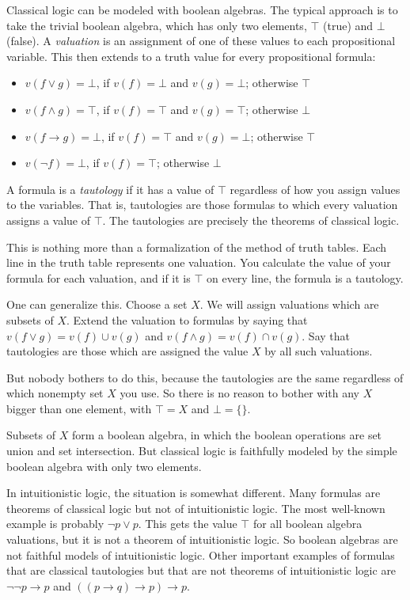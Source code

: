 \documentclass{article}
\def\imp{\rightarrow}           %
\begin{document}
Classical logic can be modeled with boolean algebras.  The typical
approach is to take the trivial boolean algebra, which has only two
elements, $\top$ (true) and $\bot$ (false).  A {\em valuation\/} is an
assignment of one of these values to each propositional variable.
This then extends to a truth value for every propositional formula: 

\begin{itemize}
\item $v(f\vee g) = \bot$, if $v(f) = \bot$ and $v(g) = \bot$;
  otherwise $\top$
\item $v(f\wedge g) = \top$, if $v(f) = \top$ and $v(g) = \top$;
  otherwise $\bot$
\item $v(f\imp g) = \bot$, if $v(f) = \top$ and $v(g) = \bot$;
  otherwise $\top$
\item $v(\neg f) = \bot$, if $v(f) = \top$; otherwise $\bot$
\end{itemize}

A formula is a {\em tautology\/} if it has a value of $\top$
regardless of how you assign values to the variables.  That is,
tautologies are those formulas to which every valuation assigns a
value of $\top$.  The tautologies are precisely the theorems of
classical logic.

This is nothing more than a formalization of the method of truth
tables.  Each line in the truth table represents one valuation.  You
calculate the value of your formula for each valuation, and if it is
$\top$ on every line, the formula is a tautology.

One can generalize this.  Choose a set $X$.  We will assign valuations
which are subsets of $X$.  Extend the valuation to formulas by saying
that $v(f\vee g) = v(f)\cup v(g)$ and $v(f\wedge g) = v(f)\cap v(g)$.
Say that tautologies are those which are assigned the value $X$ by all
such valuations.

But nobody bothers to do this, because the tautologies are the same
regardless of which nonempty set $X$ you use.  So there is no reason
to bother with any $X$ bigger than one element, with $\top = X$ and
$\bot = \{\}$.    

Subsets of $X$ form a boolean algebra, in which the boolean operations
are set union and set intersection.  But classical logic is faithfully
modeled by the simple boolean algebra with only two elements.

In intuitionistic logic, the situation is somewhat different.  Many
formulas are theorems of classical logic but not of intuitionistic
logic.  The most well-known example is probably $\neg p\vee p$.
This gets the value $\top$ for all boolean algebra valuations, but it
is not a theorem of intuitionistic logic.  So boolean algebras are not
faithful models of intuitionistic logic.  Other important examples of
formulas that are classical tautologies but that are not theorems of
intuitionistic logic are $\neg\neg p\imp p$ and $((p\imp q)\imp p)\imp
p$.
\end{document}
